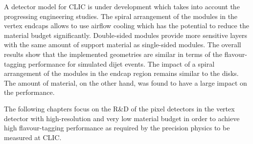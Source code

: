 A detector model for CLIC is under development which takes into
account the progressing engineering studies. The spiral arrangement of
the modules in the vertex endcaps allows to use airflow cooling which
has the potential to reduce the material budget
significantly. Double-sided modules provide more sensitive layers with
the same amount of support material as single-sided modules. The
overall results show that the implemented geometries are similar in
terms of the flavour-tagging performance for simulated dijet
events. The impact of a spiral arrangement of the modules in the
endcap region remains similar to the disks. The amount of material, on
the other hand, was found to have a large impact on the performance.

The following chapters focus on the R\&D of the pixel detectors in the
vertex detector with high-resolution and very low material budget in
order to achieve high flavour-tagging performance as required by the
precision physics to be measured at CLIC.









